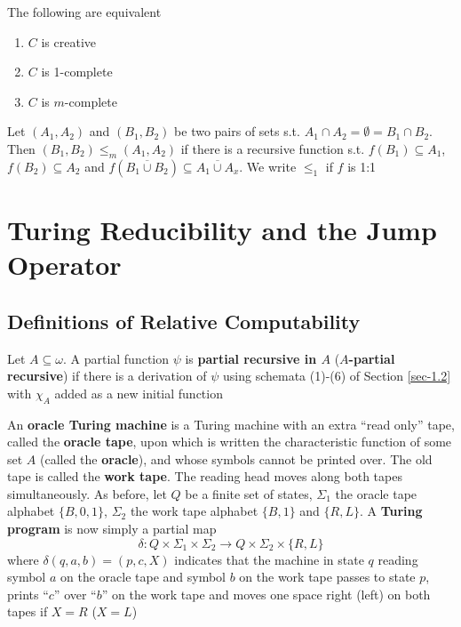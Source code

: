 \documentclass[11pt]{article}
\begin{document}
\begin{corollary}[]
The following are equivalent
\begin{enumerate}
\item \(C\) is creative
\item \(C\) is 1-complete
\item \(C\) is \(m\)-complete
\end{enumerate}
\end{corollary}

\begin{definition}[]
Let \((A_1,A_2)\) and \((B_1,B_2)\) be two pairs of sets s.t.
\(A_1\cap A_2=\emptyset=B_1\cap B_2\). Then \((B_1,B_2)\le_m(A_1,A_2)\) if
there is a recursive function s.t. \(f(B_1)\subseteq A_1\),
\(f(B_2)\subseteq A_2\) and
\(f(\overbar{B_1\cup B_2})\subseteq\overbar{A_1\cup A_x}\). We write
\(\le_1\) if \(f\) is 1:1
\end{definition}
\section{Turing Reducibility and the Jump Operator}
\label{sec:org43abf28}
\subsection{Definitions of Relative Computability}
\label{sec:orgd978cdd}
\begin{definition}[]
Let \(A\subseteq\omega\). A partial function \(\psi\) is \textbf{partial recursive in
\(A\)} (\textbf{\(A\)-partial recursive}) if there is a derivation of \(\psi\) using
schemata (1)-(6) of Section \ref{sec-1.2} with \(\chi_A\) added as a new
initial function
\end{definition}

An \textbf{oracle Turing machine} is a Turing machine with an extra ``read only''
tape, called the \textbf{oracle tape}, upon which is written the characteristic
function of some set \(A\) (called the \textbf{oracle}), and whose symbols cannot be
printed over. The old tape is called the \textbf{work tape}. The reading head moves
along both tapes simultaneously. As before, let \(Q\) be a finite set of
states, \(\Sigma_1\) the oracle tape alphabet \(\{B,0,1\}\), \(\Sigma_2\) the
work tape alphabet \(\{B,1\}\) and \(\{R,L\}\). A \textbf{Turing program} is now
simply a partial map
\begin{equation*}
\delta:Q\times\Sigma_1\times\Sigma_2\to Q\times\Sigma_2\times\{R,L\}
\end{equation*}
where \(\delta(q,a,b)=(p,c,X)\) indicates that the machine in state \(q\)
reading symbol \(a\) on the oracle tape and symbol \(b\) on the work tape
passes to state \(p\), prints ``\(c\)'' over ``\(b\)'' on the work tape and moves
one space right (left) on both tapes if \(X=R\) (\(X=L\))
\end{document}
